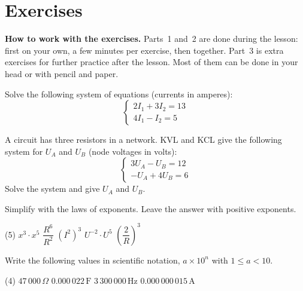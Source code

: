 
\section{Exercises}
\label{c5:sec:uppgifter}

\begin{aside}
\textbf{How to work with the exercises.} Parts~1 and~2 are done during the lesson: first on your
own, a few minutes per exercise, then together. Part~3 is extra exercises for further practice
after the lesson. Most of them can be done in your head or with pencil and paper.

\end{aside}


Solve the following system of equations (currents in amperes):
\[
  \begin{cases}
    2I_1 + 3I_2 = 13 \\
    4I_1 - I_2 = 5
  \end{cases}
\]

A circuit has three resistors in a network. KVL and KCL give the following system for $U_A$ and
$U_B$ (node voltages in volts):
\[
  \begin{cases}
    3U_A - U_B = 12 \\
    -U_A + 4U_B = 6
  \end{cases}
\]
Solve the system and give $U_A$ and $U_B$.


Simplify with the laws of exponents. Leave the answer with positive exponents.
\begin{delar}(5)
  \task $x^3 \cdot x^5$
  \task $\dfrac{R^6}{R^2}$
  \task $(I^2)^3$
  \task $U^{-2} \cdot U^5$
  \task $\left(\dfrac{2}{R}\right)^3$
\end{delar}

Write the following values in scientific notation, $a \times 10^n$ with $1 \leq a < 10$.
\begin{delar}(4)
  \task $47\,000\,\Omega$
  \task $0.000\,022\,\text{F}$
  \task $3\,300\,000\,\text{Hz}$
  \task $0.000\,000\,015\,\text{A}$
\end{delar}

